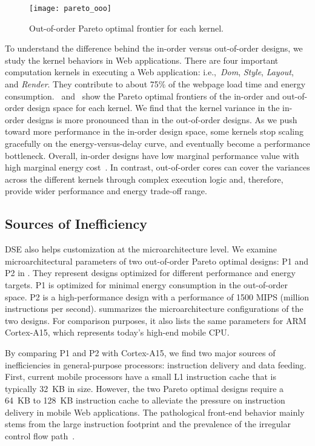 \begin{figure}[t]
  \centering
  \texttt{[image: pareto\_ooo]}
  \caption{Out-of-order Pareto optimal frontier for each kernel.}
  \label{fig:pareto_ooo}
\end{figure}

To understand the difference behind the in-order versus out-of-order designs, we study the kernel behaviors in Web applications. There are four important computation kernels in executing a Web application: i.e.,~\textit{Dom}, \textit{Style}, \textit{Layout}, and \textit{Render}. They contribute to about 75\% of the webpage load time and energy consumption.~ and~ show the Pareto optimal frontiers of the in-order and out-of-order design space for each kernel. We find that the kernel variance in the in-order designs is more pronounced than in the out-of-order designs. As we push toward more performance in the in-order design space, some kernels stop scaling gracefully on the energy-versus-delay curve, and eventually become a performance bottleneck. Overall, in-order designs have low marginal performance value with high marginal energy cost~\cite{marginal}. In contrast, out-of-order cores can cover the variances across the different kernels through complex execution logic and, therefore, provide wider performance and energy trade-off range.

\subsection{Sources of Inefficiency}
\label{sec:arch:customization:sources}

DSE also helps customization at the microarchitecture level. We examine microarchitectural parameters of two out-of-order Pareto optimal designs: P1 and P2 in . They represent designs optimized for different performance and energy targets. P1 is optimized for minimal energy consumption in the out-of-order space. P2 is a high-performance design with a performance of 1500 MIPS (million instructions per second).  summarizes the microarchitecture configurations of the two designs. For comparison purposes, it also lists the same parameters for ARM Cortex-A15, which represents today's high-end mobile CPU.



By comparing P1 and P2 with Cortex-A15, we find two major sources of inefficiencies in general-purpose processors: instruction delivery and data feeding. First, current mobile processors have a small L1 instruction cache that is typically 32~KB in size. However, the two Pareto optimal designs require a 64~KB to 128~KB instruction cache to alleviate the pressure on instruction delivery in mobile Web applications. The pathological front-end behavior mainly stems from the large instruction footprint and the prevalence of the irregular control flow path~\cite{BBench}.

